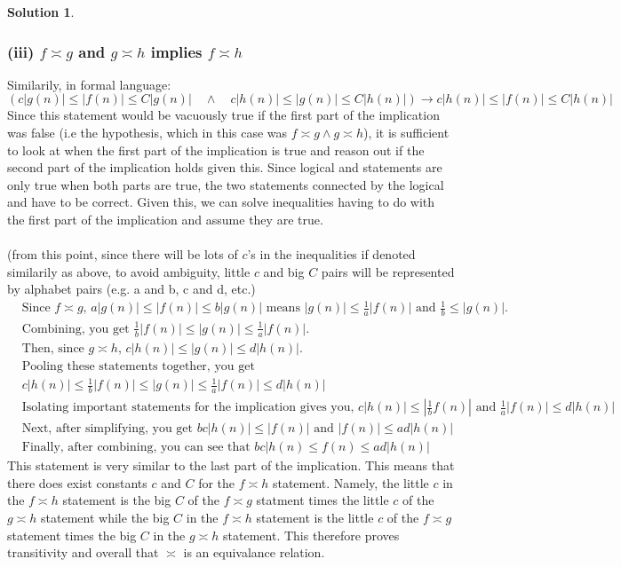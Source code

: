 \documentclass{article}
\theoremstyle{definition}
\newtheorem*{solution}{Solution}
\begin{document}
\begin{solution}
\subsubsection*{(iii) $f \asymp g$ and $g \asymp h$ implies $f \asymp h$}
Similarily, in formal language:\\
$$ (c|g(n)| \leqslant |f(n)| \leqslant C|g(n)| \quad \land \quad c|h(n)| \leqslant |g(n)| \leqslant C|h(n)|) \rightarrow c|h(n)| \leqslant |f(n)| \leqslant C|h(n)| $$
Since this statement would be vacuously true if the first part of the implication was false (i.e the hypothesis, which in this case was $f \asymp g \land g \asymp h$), it is sufficient to look at when the first part of the implication is true and reason out if the second part of the implication holds given this. Since logical and statements are only true when both parts are true, the two statements connected by the logical and have to be correct. Given this, we can solve inequalities having to do with the first part of the implication and assume they are true.\\\\
(from this point, since there will be lots of $c$'s in the inequalities if denoted similarily as above, to avoid ambiguity, little $c$ and big $C$ pairs will be represented by alphabet pairs (e.g. a and b, c and d, etc.)
\begin{align*}
&\mbox{Since $f \asymp g$, }a|g(n)| \leqslant |f(n)| \leqslant b|g(n)| \mbox{ means } |g(n)| \leqslant \frac{1}{a}|f(n)| \mbox{ and } \frac{1}{b} \leqslant |g(n)|\mbox{.}\\
&\mbox{Combining, you get } \frac{1}{b}|f(n)| \leqslant |g(n)| \leqslant \frac{1}{a} |f(n)|\mbox{.}\\
&\mbox{Then, since $g \asymp h$, } c|h(n)| \leqslant |g(n)| \leqslant d|h(n)|\mbox{.}\\
&\mbox{Pooling these statements together, you get }\\
&c|h(n)| \leqslant \frac{1}{b} |f(n)| \leqslant |g(n)| \leqslant \frac{1}{a} |f(n)| \leqslant d|h(n)|\\
&\mbox{Isolating important statements for the implication gives you, } c|h(n)| \leqslant |\frac{1}{b}f(n)| \mbox{ and } \frac{1}{a} |f(n)| \leqslant d|h(n)|\\
&\mbox{Next, after simplifying, you get } bc |h(n)| \leqslant |f(n)| \mbox{ and } |f(n)| \leqslant ad|h(n)|\\
&\mbox{Finally, after combining, you can see that } bc|h(n) \leqslant f(n) \leqslant ad|h(n)| 
\end{align*}
This statement is very similar to the last part of the implication. This means that there does exist constants $c$ and $C$ for the $f \asymp h$ statement. Namely, the little $c$ in the $f \asymp h$ statement is the big $C$ of the $f \asymp g$ statment times the little $c$ of the $g \asymp h$ statement while the big $C$ in the $f \asymp h$ statement is the little $c$ of the $f \asymp g$ statement times the big $C$ in the $g \asymp h$ statement. This therefore proves transitivity and overall that $\asymp$ is an equivalance relation.
\end{solution}
\end{document}
